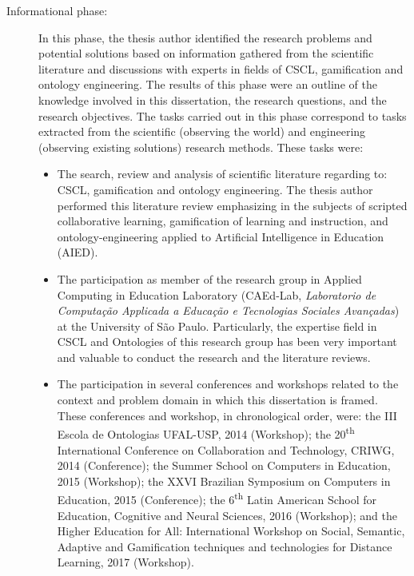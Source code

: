 \begin{description}
\item[Informational phase:]
In this phase, the thesis author identified the research problems and potential solutions based on information gathered from the scientific literature and discussions with experts in fields of CSCL, gamification and ontology engineering.
The results of this phase were an outline of the knowledge involved in this dissertation, the research questions, and the research objectives.
The tasks carried out in this phase correspond to tasks extracted from the scientific (observing the world) and engineering (observing existing solutions) research methods.
These tasks were:

\begin{itemize}
\item
The search, review and analysis of scientific literature regarding to: CSCL, gamification and ontology engineering.
The thesis author performed this literature review emphasizing in the subjects of scripted collaborative learning, gamification of learning and instruction, and ontology-engineering applied to Artificial Intelligence in Education (AIED).

\item
The participation as member of the research group in Applied Computing in Education Laboratory (CAEd-Lab, \emph{Laboratorio de Computação Applicada a Educação e Tecnologias Sociales Avançadas}) at the University of São Paulo.
Particularly, the expertise field in CSCL and Ontologies of this research group has been very important and valuable to conduct the research and the literature reviews.

\item
The participation in several conferences and workshops related to the context and problem domain in which this dissertation is framed.
These conferences and workshop, in chronological order, were:
the III Escola de Ontologias UFAL-USP, 2014 (Workshop);
the 20\textsuperscript{th} International Conference on Collaboration and Technology, CRIWG, 2014 (Conference);
the Summer School on Computers in Education, 2015 (Workshop);
the XXVI Brazilian Symposium on Computers in Education, 2015 (Conference);
the 6\textsuperscript{th} Latin American School for Education, Cognitive and Neural Sciences, 2016 (Workshop); and
the Higher Education for All: International Workshop on Social, Semantic, Adaptive and Gamification techniques and technologies for Distance Learning, 2017 (Workshop).


\end{itemize}
\end{description}
